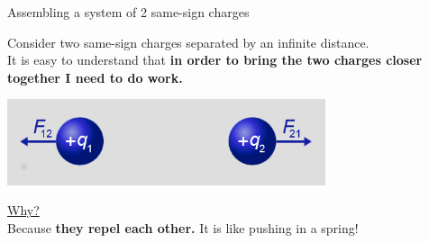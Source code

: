 \begin{frame}{Assembling a system of 2 same-sign charges}

Consider two same-sign charges separated by an infinite distance.\\
\vspace{0.2cm}
It is easy to understand that {\bf in order to bring the two charges closer together I need to do work.}\\
\vspace{0.3cm}

\begin{center}
  \includegraphics[width=0.70\textwidth]{./images/schematics/coulomb_force_2_like_sign_charges.png}\\
\end{center}

\vspace{0.2cm}
\underline{Why?}\\
\vspace{0.1cm}
Because {\bf they repel each other.} It is like pushing in a spring!

\end{frame}


